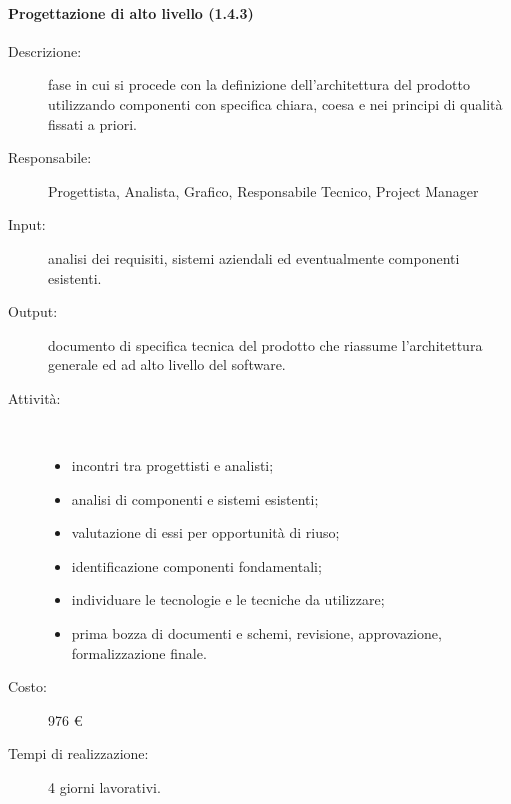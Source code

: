 \paragraph{Progettazione di alto livello (1.4.3)}
\begin{description}
\item[Descrizione:] fase in cui si procede con la definizione dell'architettura del prodotto utilizzando componenti con
specifica chiara, coesa e nei principi di qualit\`{a} fissati a priori.
\item[Responsabile:] Progettista, Analista, Grafico, Responsabile Tecnico, Project Manager
\item[Input:] analisi dei requisiti, sistemi aziendali ed eventualmente componenti esistenti.
\item[Output:] documento di specifica tecnica del prodotto che riassume l'architettura generale ed ad
alto livello del software.
\item[Attività:]\mbox{}\\[-1.5\baselineskip]
	\begin{itemize}
	\item incontri tra progettisti e analisti;
	\item analisi di componenti e sistemi esistenti;
	\item valutazione di essi per opportunità di riuso;
	\item identificazione componenti fondamentali;
	\item individuare le tecnologie e le tecniche da utilizzare;
	\item prima bozza di documenti e schemi, revisione, approvazione, formalizzazione finale.
	\end{itemize}
\item[Costo:] 976 \euro{}
\item[Tempi di realizzazione:] 4 giorni lavorativi.
\end{description}

